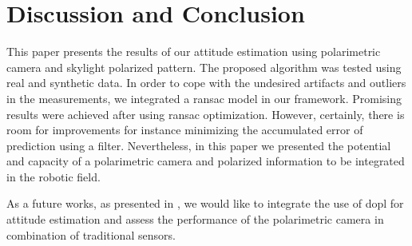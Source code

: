 \section{Discussion and Conclusion}
\label{sec:dis-con}

This paper presents the results of our attitude estimation using polarimetric
camera and skylight polarized pattern.  The proposed algorithm was tested using
real and synthetic data.  In order to cope with the undesired artifacts and
outliers in the measurements, we integrated a ransac model in our framework.
Promising results were achieved after using ransac optimization.  However,
certainly, there is room for improvements for instance minimizing the
accumulated error of prediction using a filter.  Nevertheless, in this paper we
presented the potential and capacity of a polarimetric camera and polarized
information to be integrated in the robotic field.

As a future works, as presented in \cite{hamaoui2017polarized}, we would like
to integrate the use of \gls{dopl} for attitude estimation and assess the
performance of the polarimetric camera in combination of traditional sensors.






